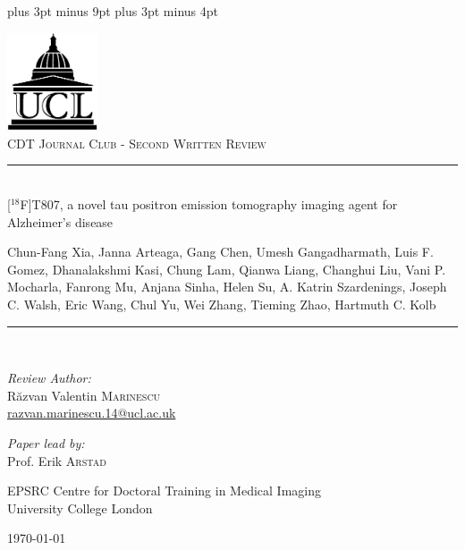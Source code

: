 \documentclass[11pt,a4paper,oneside]{report}
\begin{document}
\belowdisplayskip=12pt plus 3pt minus 9pt
\belowdisplayshortskip=7pt plus 3pt minus 4pt


\begin{titlepage}
\begin{center}

\includegraphics[width=0.2\textwidth]{ucl-logo2}~\\[1cm]


\textsc{\Large CDT Journal Club - Second Written Review}\\[0.5cm]

\newcommand{\HRule}{\rule{\linewidth}{0.5mm}}

\HRule \\[0.4cm]
{ \Large [$^{18}$F]T807, a novel tau positron emission tomography imaging agent for Alzheimer's disease \\[0.4cm] }

{ \small Chun-Fang Xia, Janna Arteaga, Gang Chen, Umesh Gangadharmath, Luis F. Gomez, Dhanalakshmi Kasi, Chung Lam, Qianwa Liang, Changhui Liu, Vani P. Mocharla, Fanrong Mu, Anjana Sinha, Helen Su, A. Katrin Szardenings, Joseph C. Walsh, Eric Wang, Chul Yu, Wei Zhang, Tieming Zhao, Hartmuth C. Kolb }

\HRule \\[1.5cm]

\begin{minipage}{0.4\textwidth}
\begin{flushleft} \large
\emph{Review Author:}\\
R\u{a}zvan Valentin \textsc{Marinescu}\\
\href{razvan.marinescu.14@ucl.ac.uk}{razvan.marinescu.14@ucl.ac.uk}\\
\end{flushleft}
\end{minipage}
\begin{minipage}{0.4\textwidth}
\begin{flushright} \large
\emph{Paper lead by:} \\
Prof. Erik \textsc{Arstad}\\
\end{flushright}
\end{minipage}

\vfill

EPSRC Centre for Doctoral Training in Medical Imaging\\ University College London

\vfill

{\large \today}

\end{center}
\end{titlepage}
\end{document}

